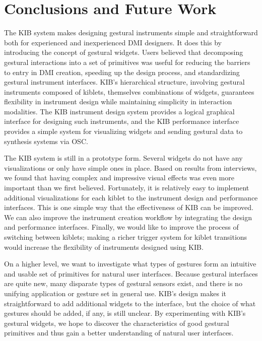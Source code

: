 \documentclass{nime-alternate}
\begin{document}
\section{Conclusions and Future Work}
The KIB system makes designing gestural instruments simple and straightforward both for experienced
and inexperienced DMI designers. It does this by introducing the concept of gestural widgets. 
Users believed that decomposing gestural interactions into a set
of primitives was useful for reducing the barriers to entry in DMI creation, speeding up the design process,
and standardizing gestural instrument interfaces. KIB's hierarchical structure, involving gestural instruments composed
of kiblets, themselves combinations of widgets, guarantees flexibility in instrument design while maintaining simplicity
in interaction modalities. The KIB instrument design system provides a logical graphical interface for designing
such instruments, and the KIB performance interface provides a simple system for visualizing widgets and sending gestural data
to synthesis systems via OSC.

The KIB system is still in a prototype form. Several widgets do not have any visualizations or only have simple ones in place.
Based on results from interviews, we found that having complex and impressive visual effects
was even more important than we first believed. Fortunately, it is relatively easy to implement additional visualizations for 
each kiblet to the instrument design and performance interfaces. This is one simple way that the effectiveness of KIB
can be improved. We can also improve the instrument creation workflow by integrating the design and performance interfaces. Finally, we would like to improve the process of switching between kiblets; making a richer trigger system for kiblet
transitions would increase the flexibility of instruments designed using KIB.

On a higher level, we want to investigate what types of gestures form an intuitive and usable set of primitives for natural
user interfaces. Because gestural interfaces are quite new, many disparate types of gestural sensors exist, and there is no
unifying application or gesture set in general use. KIB's design makes it straightforward to add
additional widgets to the interface, but the choice of what gestures should be added, if any, is still unclear. By
experimenting with KIB's gestural widgets, we hope to discover the characteristics of good
gestural primitives and thus gain a better understanding of natural user interfaces.


%
\end{document}

